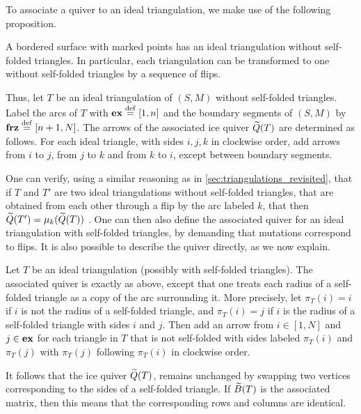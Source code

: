 To associate a quiver to an ideal triangulation, we make use of the following
proposition.

\begin{proposition}

	A bordered surface with marked points has an ideal triangulation without self-folded
	triangles. In particular, each triangulation can be transformed to one without
	self-folded triangles by a sequence of flips.
\end{proposition}

Thus, let $T$ be an ideal triangulation of $(S, M)$ without self-folded triangles.
Label the arcs of $T$ with $\mathbf{ex} \overset{\mathrm{def}}{=} [1,n]$ and the boundary segments of $(S, M)$ by
$\mathbf{frz} \overset{\mathrm{def}}{=} [n+1, N]$. The arrows of the associated ice quiver $\widetilde{Q}(T)$ are determined
as follows. For each ideal triangle, with sides $i,j,k$ in clockwise order, add arrows
from $i$ to $j$, from $j$ to $k$ and from $k$ to $i$, except between boundary segments.

One can verify, using a similar reasoning as in \cref{sec:triangulations_revisited},
that if $T$ and $T'$ are two ideal triangulations without self-folded triangles, that
are obtained from each other through a flip by the arc labeled $k$, that then $\widetilde{Q}(T')
	= \mu_k(\widetilde{Q}(T))$ \parencite[Proposition 4.8]{FominShapiroThurston2008CATriangulatedSurfacesI}. One can then
also define the associated quiver for an ideal triangulation with self-folded
triangles, by demanding that mutations correspond to flips. It is also possible to
describe the quiver directly, as we now explain.

Let $T$ be an ideal triangulation (possibly with self-folded triangles). The associated
quiver is exactly as above, except that one treats each radius of a self-folded
triangle as a copy of the arc surrounding it. More precisely, let $\pi_T(i) = i$ if $i$
is not the radius of a self-folded triangle, and $\pi_T(i) = j$ if $i$ is the radius of
a self-folded triangle with sides $i$ and $j$. Then add an arrow from $i \in [1, N]$
and $j \in \mathbf{ex}$ for each triangle in $T$ that is not self-folded with sides labeled
$\pi_T(i)$ and $\pi_T(j)$ with $\pi_T(j)$ following $\pi_T(i)$ in clockwise order.

It follows that the ice quiver $\widetilde{Q}(T)$, remains unchanged by swapping two vertices
corresponding to the sides of a self-folded triangle. If $\widetilde{B}(T)$ is the associated
matrix, then this means that the corresponding rows and columns are identical.

